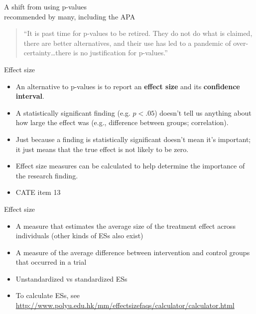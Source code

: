 \documentclass{beamer}
\begin{document}
%
\begin{frame} {A shift from using p-values\\ recommended by many, including the APA}
	\begin{quote}
		``It is past time for p-values to be retired. They do not do what is claimed, there
are better alternatives, and their use has led to a pandemic of over-certainty\ldots there is no justification for p-values.'' \citep[p. 22]{Briggs2019}
	\end{quote}
\end{frame}

% 
\begin{frame}{Effect size}
	\begin{itemize}
	\item An alternative to p-values is to report an \textbf{effect size} and its \textbf{confidence interval}.
	\item A statistically significant finding (e.g. $p < .05$) doesn't tell us anything about how large the effect was (e.g., difference between groups; correlation).
	\item Just because a finding is statistically significant doesn't mean it's important; it just means that the true effect is not likely to be zero.
	\item Effect size measures can be calculated to help determine the importance of the research finding.
	\item CATE item 13
	\end{itemize}
\end{frame}

% 
\begin{frame}{Effect size}
	\begin{itemize}
	\item A measure that estimates the \alert{average size} of the treatment effect across individuals (other kinds of ESs also exist) 
	\item A measure of the \alert{average difference} between intervention and control groups that occurred in a trial
	\item Unstandardized vs standardized ESs
	\item To calculate ESs, see \url{http://www.polyu.edu.hk/mm/effectsizefaqs/calculator/calculator.html}
	\end{itemize}
\end{frame}
\end{document}
